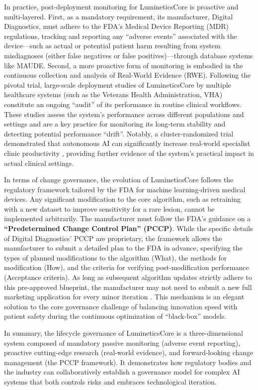 \documentclass[sigplan,screen]{acmart}
\begin{document}
In practice, post-deployment monitoring for LumineticsCore is proactive and multi-layered. First, as a mandatory requirement, its manufacturer, Digital Diagnostics, must adhere to the FDA's Medical Device Reporting (MDR) regulations, tracking and reporting any ``adverse events'' associated with the device---such as actual or potential patient harm resulting from system misdiagnoses (either false negatives or false positives)---through database systems like MAUDE. Second, a more proactive form of monitoring is embodied in the continuous collection and analysis of Real-World Evidence (RWE). Following the pivotal trial, large-scale deployment studies of LumineticsCore by multiple healthcare systems (such as the Veterans Health Administration, VHA) constitute an ongoing ``audit'' of its performance in routine clinical workflows. These studies assess the system's performance across different populations and settings and are a key practice for monitoring its long-term stability and detecting potential performance ``drift''. Notably, a cluster-randomized trial demonstrated that autonomous AI can significantly increase real-world specialist clinic productivity \cite{abramoff2023autonomous}, providing further evidence of the system's practical impact in actual clinical settings.

In terms of change governance, the evolution of LumineticsCore follows the regulatory framework tailored by the FDA for machine learning-driven medical devices. Any significant modification to the core algorithm, such as retraining with a new dataset to improve sensitivity for a rare lesion, cannot be implemented arbitrarily. The manufacturer must follow the FDA's guidance on a \textbf{``Predetermined Change Control Plan'' (PCCP)}. While the specific details of Digital Diagnostics' PCCP are proprietary, the framework allows the manufacturer to submit a detailed plan to the FDA in advance, specifying the types of planned modifications to the algorithm (What), the methods for modification (How), and the criteria for verifying post-modification performance (Acceptance criteria). As long as subsequent algorithm updates strictly adhere to this pre-approved blueprint, the manufacturer may not need to submit a new full marketing application for every minor iteration \cite{fda2025aiml}. This mechanism is an elegant solution to the core governance challenge of balancing innovation speed with patient safety during the continuous optimization of ``black-box'' models.

In summary, the lifecycle governance of LumineticsCore is a three-dimensional system composed of mandatory passive monitoring (adverse event reporting), proactive cutting-edge research (real-world evidence), and forward-looking change management (the PCCP framework). It demonstrates how regulatory bodies and the industry can collaboratively establish a governance model for complex AI systems that both controls risks and embraces technological iteration.
\end{document}
